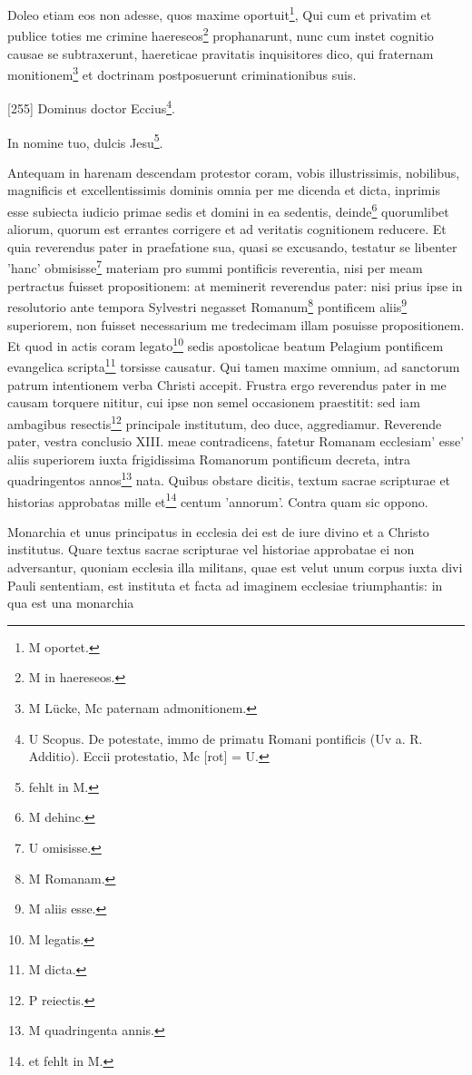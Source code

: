 Doleo etiam eos non adesse, quos maxime oportuit\footnote{M oportet.}, Qui cum et privatim et publice toties me crimine haereseos\footnote{M in haereseos.} prophanarunt, nunc cum instet cognitio causae se subtraxerunt, haereticae pravitatis inquisitores dico, qui fraternam monitionem\footnote{M Lücke, Mc paternam admonitionem.} et doctrinam postposuerunt criminationibus suis.

[255] Dominus doctor Eccius\footnote{U Scopus. De potestate, immo de primatu Romani pontificis (Uv a. R. Additio). Eccii protestatio, Mc [rot] = U.}.

In nomine tuo, dulcis Jesu\footnote{fehlt in M.}.

Antequam in harenam descendam protestor coram, vobis illustrissimis, nobilibus, magnificis et excellentissimis dominis omnia per me dicenda et dicta, inprimis esse subiecta iudicio primae sedis et domini in ea sedentis, deinde\footnote{M dehinc.} quorumlibet aliorum, quorum est errantes corrigere et ad veritatis cognitionem reducere. Et quia reverendus pater in praefatione sua, quasi se excusando, testatur se libenter 'hanc' obmisisse\footnote{U omisisse.} materiam pro summi pontificis reverentia, nisi per meam pertractus fuisset propositionem: at meminerit reverendus pater: nisi prius ipse in resolutorio ante tempora Sylvestri negasset Romanum\footnote{M Romanam.} pontificem aliis\footnote{M aliis esse.} superiorem, non fuisset necessarium me tredecimam illam posuisse propositionem. Et quod in actis coram legato\footnote{M legatis.} sedis apostolicae beatum Pelagium pontificem evangelica scripta\footnote{M dicta.} torsisse causatur. Qui tamen maxime omnium, ad sanctorum patrum intentionem verba Christi accepit. Frustra ergo reverendus pater in me causam torquere nititur, cui ipse non semel occasionem praestitit: sed iam ambagibus resectis\footnote{P reiectis.} principale institutum, deo duce, aggrediamur. Reverende pater, vestra conclusio XIII. meae contradicens, fatetur Romanam ecclesiam' esse' aliis superiorem iuxta frigidissima Romanorum pontificum decreta, intra quadringentos annos\footnote{M quadringenta annis.} nata. Quibus obstare dicitis, textum sacrae scripturae et historias approbatas mille et\footnote{et fehlt in M.} centum 'annorum'. Contra quam sic oppono.

Monarchia et unus principatus in ecclesia dei est de iure divino et a Christo institutus. Quare textus sacrae scripturae vel historiae approbatae ei non adversantur, quoniam ecclesia illa militans, quae est velut unum corpus iuxta divi Pauli sententiam, est instituta et facta ad imaginem ecclesiae triumphantis: in qua est una monarchia
